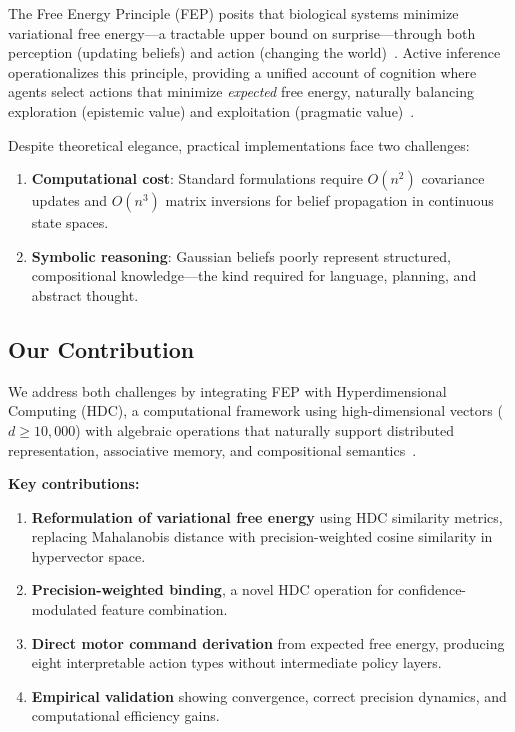 \documentclass[10pt,letterpaper]{article}
\begin{document}
The Free Energy Principle (FEP) posits that biological systems minimize variational free energy---a tractable upper bound on surprise---through both perception (updating beliefs) and action (changing the world)~\cite{friston2010free}.
Active inference operationalizes this principle, providing a unified account of cognition where agents select actions that minimize \emph{expected} free energy, naturally balancing exploration (epistemic value) and exploitation (pragmatic value)~\cite{friston2017active}.

Despite theoretical elegance, practical implementations face two challenges:
\begin{enumerate}[nosep]
  \item \textbf{Computational cost}: Standard formulations require $O(n^2)$ covariance updates and $O(n^3)$ matrix inversions for belief propagation in continuous state spaces.
  \item \textbf{Symbolic reasoning}: Gaussian beliefs poorly represent structured, compositional knowledge---the kind required for language, planning, and abstract thought.
\end{enumerate}

\subsection{Our Contribution}

We address both challenges by integrating FEP with Hyperdimensional Computing (HDC), a computational framework using high-dimensional vectors ($d \geq 10{,}000$) with algebraic operations that naturally support distributed representation, associative memory, and compositional semantics~\cite{kanerva2009hyperdimensional}.

\textbf{Key contributions:}
\begin{enumerate}[nosep]
  \item \textbf{Reformulation of variational free energy} using HDC similarity metrics, replacing Mahalanobis distance with precision-weighted cosine similarity in hypervector space.
  \item \textbf{Precision-weighted binding}, a novel HDC operation for confidence-modulated feature combination.
  \item \textbf{Direct motor command derivation} from expected free energy, producing eight interpretable action types without intermediate policy layers.
  \item \textbf{Empirical validation} showing convergence, correct precision dynamics, and computational efficiency gains.
\end{enumerate}
\end{document}
